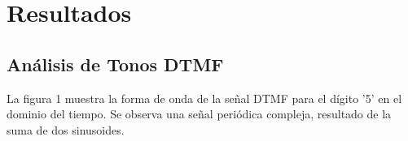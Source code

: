 \documentclass[journal]{IEEEtran} %
\begin{document}



\section{Resultados}

\subsection{Análisis de Tonos DTMF}\label{AA}
La figura 1 muestra la forma de onda de la señal DTMF para el dígito '5' en el dominio del tiempo. Se observa una señal periódica compleja, resultado de la suma de dos sinusoides.
\end{document}
